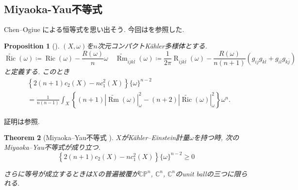 \documentclass[dvipdfmx,a4paper,11pt]{article} %
\newtheorem{thm}{Theorem}[section]
\newtheorem{prop}[thm]{Proposition}
\theoremstyle{definition}
\theoremstyle{remark}
\numberwithin{equation}{section}
\DeclareMathOperator{\Ric}{Ric}
\newcommand{\C}{\mathbb{C}}
\begin{document}
 \subsection{Miyaoka-Yau不等式}
 
 
Chen--Ogiue \cite{CO75}による恒等式を思い出そう. 今回は\cite{Hisa24}を参照した.
\begin{prop}[{\cite{CO75, Hisa24}}] 
\label{prop-miyaoka-yau-curvature}
\((X,\omega)\)を\(n\)次元コンパクトK\"ahler多様体とする.
\[
\widetilde{\Ric}(\omega)
\coloneqq 
\Ric(\omega)
-
\frac{R(\omega)}{n}\omega
\quad 
\widetilde{\operatorname{Rm}}_{i\overline j k\overline l}(\omega)
\coloneqq 
\frac{1}{2\pi}\operatorname{R}_{i\overline j k\overline l}(\omega)
-
\frac{R(\omega)}{n(n+1)}
\left(
g_{i\overline j}g_{k\overline l}
+
g_{i\overline l}g_{k\overline j}
\right)
\]
と定義する. 
このとき
\[
\begin{aligned}
&\left\{
2(n+1)c_2(X)-nc_{1}^{2}(X)
\right\}\{\omega\}^{n-2}
\\
&=
\frac{1}{n(n-1)}
\int_X
\left\{
(n+1)\left\lvert \widetilde{\operatorname{Rm}}(\omega)\right\rvert_{\omega}^2
-
(n+2)\left\lvert \widetilde{\Ric}(\omega)\right\rvert_{\omega}^2
\right\}
\omega^n .
\end{aligned}
\]
\end{prop}
証明は\cite[Proposition 4.17]{Iwa-Chern}参照. 

\begin{thm}[Miyaoka--Yau不等式 {\cite{CO75, Yau77}}]
\label{thm-MY-curv}
$X$がK\"ahler--Einstein計量$\omega$を持つ時, 次のMiyaoka--Yau不等式が成り立つ. 
\[
\left\{
2(n+1)c_2(X)-nc_{1}^{2}(X)
\right\}
\{\omega\}^{n-2}
\geq 0
\]

さらに等号が成立するときは$X$の普遍被覆が$\C\mathbb{P}^n$, $\C^n$, $\C^n$のunit ballの三つに限られる.
\end{thm}
\end{document}
